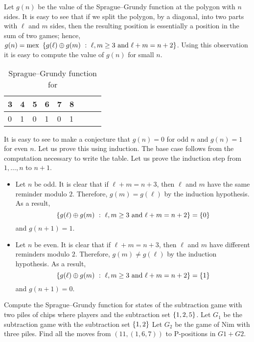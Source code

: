 Let $g(n)$ be the value of the Sprague--Grundy function at the polygon with $n$
sides. It is easy to see that if we split the polygon, by a diagonal, into two
parts with $\ell$ and $m$ sides, then the resulting position is essentially a
position in the sum of two games; 
hence, 
$g(n) = 
  \mex \set[
    \ell, m \ge 3 \text{ and } \ell + m = n + 2
  ]{g(\ell) \bitwisexor g(m)}$.
Using this observation it is easy to compute the value of $g(n)$ for small $n$.
\begin{table}[h!]
  \centering
  \begin{tabular}{l l l l l l l l l}
      \toprule
      3 & 4 & 5 & 6 & 7 & 8 \\
      \midrule
      0 & 1 & 0 & 1 & 0 & 1 \\
      \bottomrule
  \end{tabular}
  \caption{Sprague--Grundy function for }
\end{table}
It is easy to see to make a conjecture that $g(n) = 0$ for odd $n$ and $g(n) =
1$ for even $n$. Let us prove this using induction. The base case follows from
the computation necessary to write the table. Let us prove the induction step
from $1, \dots, n$ to $n + 1$.
\begin{itemize}
  \item Let $n$ be odd. It is clear that if $\ell + m = n + 3$, then $\ell$ and
    $m$ have the same reminder modulo $2$. Therefore, $g(m) = g(\ell)$ by the
    induction hypothesis. As a result, 
    \[
      \set[
        \ell, m \ge 3 \text{ and } \ell + m = n + 2
      ]{g(\ell) \bitwisexor g(m)} = \set{0}
    \] and $g(n + 1) = 1$.
    
  \item Let $n$ be even. It is clear that if $\ell + m = n + 3$, then $\ell$ and
    $m$ have different reminders modulo $2$. Therefore, $g(m) \neq g(\ell)$ by the
    induction hypothesis. As a result, 
    \[
      \set[
        \ell, m \ge 3 \text{ and } \ell + m = n + 2
      ]{g(\ell) \bitwisexor g(m)} = \set{1}
    \] 
    and $g(n + 1) = 0$.
\end{itemize}
\begin{chapterendexercises}
    \exercise Compute the Sprague--Grundy function for states of the subtraction
      game with two piles of chips where players and the subtraction set 
      $\set{1, 2, 5}$.
    \exercise Let $G_1$ be the subtraction game with the subtraction set
      $\set{1, 2}$
      Let $G_2$ be the game of Nim with three piles.
      Find all the moves from $(11, (1, 6, 7))$ to P-positions in 
      $G1 + G2$.
\end{chapterendexercises}
